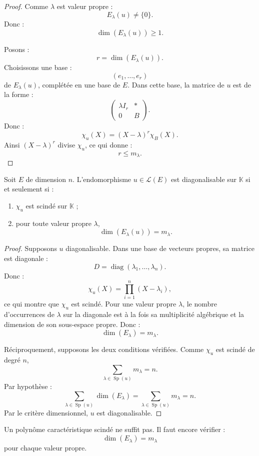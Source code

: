 \documentclass[11pt,a4paper]{article}
\newcommand{\K}{\mathbb K}
\newcommand{\Lcal}{\mathcal L}
\newcommand{\Sp}{\operatorname{Sp}}
\newcommand{\diag}{\operatorname{diag}}
\begin{document}
\begin{proof}
Comme \(\lambda\) est valeur propre :
\[
E_\lambda(u)\neq\{0\}.
\]
Donc :
\[
\dim(E_\lambda(u))\geq1.
\]

Posons :
\[
r=\dim(E_\lambda(u)).
\]
Choisissons une base :
\[
(e_1,\dots,e_r)
\]
de \(E_\lambda(u)\), complétée en une base de \(E\).  
Dans cette base, la matrice de \(u\) est de la forme :
\[
\begin{pmatrix}
\lambda I_r & *\\
0 & B
\end{pmatrix}.
\]
Donc :
\[
\chi_u(X)=(X-\lambda)^r\chi_B(X).
\]
Ainsi \((X-\lambda)^r\) divise \(\chi_u\), ce qui donne :
\[
r\leq m_\lambda.
\]
\end{proof}

\begin{theorembox}
Soit \(E\) de dimension \(n\).  
L'endomorphisme \(u\in\Lcal(E)\) est diagonalisable sur \(\K\) si et seulement si :
\begin{enumerate}
    \item \(\chi_u\) est scindé sur \(\K\) ;
    \item pour toute valeur propre \(\lambda\),
    \[
    \dim(E_\lambda(u))=m_\lambda.
    \]
\end{enumerate}
\end{theorembox}

\begin{proof}
Supposons \(u\) diagonalisable.  
Dans une base de vecteurs propres, sa matrice est diagonale :
\[
D=\diag(\lambda_1,\dots,\lambda_n).
\]
Donc :
\[
\chi_u(X)=\prod_{i=1}^n(X-\lambda_i),
\]
ce qui montre que \(\chi_u\) est scindé.  
Pour une valeur propre \(\lambda\), le nombre d'occurrences de \(\lambda\) sur la diagonale est à la fois sa multiplicité algébrique et la dimension de son sous-espace propre.  
Donc :
\[
\dim(E_\lambda)=m_\lambda.
\]

Réciproquement, supposons les deux conditions vérifiées.  
Comme \(\chi_u\) est scindé de degré \(n\),
\[
\sum_{\lambda\in\Sp(u)}m_\lambda=n.
\]
Par hypothèse :
\[
\sum_{\lambda\in\Sp(u)}\dim(E_\lambda)
=
\sum_{\lambda\in\Sp(u)}m_\lambda
=
n.
\]
Par le critère dimensionnel, \(u\) est diagonalisable.
\end{proof}

\begin{erreurbox}
Un polynôme caractéristique scindé ne suffit pas.  
Il faut encore vérifier :
\[
\dim(E_\lambda)=m_\lambda
\]
pour chaque valeur propre.
\end{erreurbox}
\end{document}
